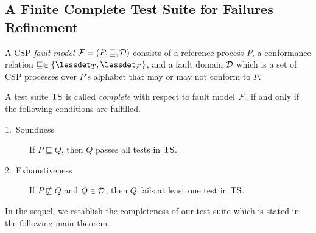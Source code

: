 

\subsection{A Finite Complete Test Suite for Failures Refinement}


A CSP \emph{fault model} ${\cal F} = (P,\sqsubseteq,{\cal D})$ consists of a
reference process $P$, a conformance relation $\sqsubseteq \in \{\lessdet_T,
\lessdet_F\}$, and a fault domain ${\cal D}$ which is a set of CSP processes
over $P$'s alphabet that may or may not conform to $P$.

A test suite ${\text{TS}}$ is called \emph{complete} with respect to fault model ${\cal F}$,
if and only if the following conditions are fulfilled.
\begin{description}
\item[1.~Soundness] If $P \sqsubseteq Q$, then $Q$ passes all tests in ${\text{TS}}$.
\item[2.~Exhaustiveness] If $P \not\sqsubseteq Q$ and $Q\in{\cal D}$,
then $Q$ fails at least one test in ${\text{TS}}$.
\end{description}
%
In the sequel, we establish the completeness of our test suite which is stated 
in the following main theorem.

